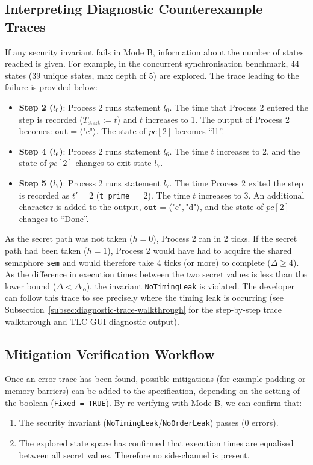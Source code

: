\documentclass[a4paper,12pt]{report}
\begin{document}
\subsection{Interpreting Diagnostic Counterexample Traces}
If any security invariant fails in Mode B, information about the number of states reached is given. For example, in the concurrent synchronisation benchmark, 44 states (39 unique states, max depth of 5) are explored. The trace leading to the failure is provided below:
\begin{itemize}[itemsep=0.2em, topsep=0.15em]
    \item \textbf{Step 2 ($l_0$)}: Process 2 runs statement $l_0$. The time that Process 2 entered the step is recorded ($T_{\text{start}} := t$) and $t$ increases to 1. The output of Process 2 becomes: $\texttt{out} = \langle \text{"c"} \rangle$. The state of $pc[2]$ becomes ``l1''.
    \item \textbf{Step 4 ($l_6$)}: Process 2 runs statement $l_6$. The time $t$ increases to 2, and the state of $pc[2]$ changes to exit state $l_7$.
    \item \textbf{Step 5 ($l_7$)}: Process 2 runs statement $l_7$. The time Process 2 exited the step is recorded as $t' = 2$ (\texttt{t\_prime} $= 2$). The time $t$ increases to 3. An additional character is added to the output, $\texttt{out} = \langle \text{"c"}, \text{"d"} \rangle$, and the state of $pc[2]$ changes to ``Done''.
\end{itemize}

As the secret path was not taken ($h = 0$), Process 2 ran in 2 ticks. If the secret path had been taken ($h = 1$), Process 2 would have had to acquire the shared semaphore \texttt{sem} and would therefore take 4 ticks (or more) to complete ($\Delta \ge 4$). As the difference in execution times between the two secret values is less than the lower bound ($\Delta < \Delta_{\text{lo}}$), the invariant \texttt{NoTimingLeak} is violated. The developer can follow this trace to see precisely where the timing leak is occurring (see Subsection~\ref{subsec:diagnostic-trace-walkthrough} for the step-by-step trace walkthrough and TLC GUI diagnostic output).

\subsection{Mitigation Verification Workflow}
Once an error trace has been found, possible mitigations (for example padding or memory barriers) can be added to the specification, depending on the setting of the boolean (\texttt{Fixed = TRUE}). By re-verifying with Mode B, we can confirm that:
\begin{enumerate}[label=\arabic*., itemsep=0.15em, topsep=0.15em]
    \item The security invariant (\texttt{NoTimingLeak}/\texttt{NoOrderLeak}) passes (0 errors).
    \item The explored state space has confirmed that execution times are equalised between all secret values. Therefore no side-channel is present.
\end{enumerate}
\end{document}
